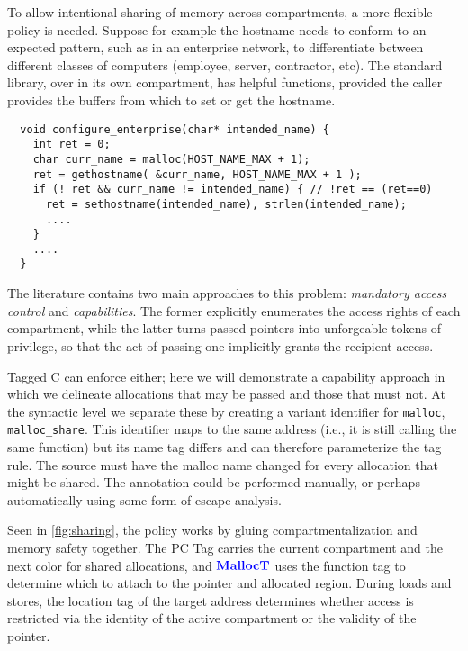 \documentclass{llncs}
\begin{document}
To allow intentional sharing of memory across compartments, a more flexible policy is needed. 
Suppose for example the hostname needs to conform to an expected pattern, 
such as in an enterprise network, to differentiate between different classes of
computers (employee, server, contractor, etc). The standard library, 
over in its own compartment, has helpful functions, 
provided the caller provides the buffers from which to set or get the hostname. 

\begin{verbatim}
  void configure_enterprise(char* intended_name) {
    int ret = 0;
    char curr_name = malloc(HOST_NAME_MAX + 1);
    ret = gethostname( &curr_name, HOST_NAME_MAX + 1 );
    if (! ret && curr_name != intended_name) { // !ret == (ret==0)
      ret = sethostname(intended_name), strlen(intended_name);
      ....
    }
    ....
  }
\end{verbatim}

The literature contains two main approaches to this problem:
{\em mandatory access control} and {\em capabilities}. The former explicitly
enumerates the access rights of each compartment, while the latter turns passed
pointers into unforgeable tokens of privilege, so that the act of passing one
implicitly grants the recipient access.

Tagged C can enforce either; here we will demonstrate a capability approach
in which we delineate allocations that may be passed and those that must not.
At the syntactic level we separate these by creating a variant identifier for {\tt malloc},
{\tt malloc\_share}. This identifier maps to the same address (i.e., it is still calling the same function)
but its name tag differs and can therefore parameterize the tag rule. The source
must have the malloc name changed for every allocation that might be shared.
The annotation could be performed manually, or perhaps automatically using some form
of escape analysis.

Seen in \cref{fig:sharing}, the policy works by gluing compartmentalization and memory safety
together. The PC Tag carries the current compartment and the next color for shared allocations,
and \(\color{blue} \mathbf{MallocT}\) uses the function tag to determine which to attach to the pointer and allocated
region. During loads and stores, the location tag of the target address
determines whether access is restricted via the identity of the active compartment or
the validity of the pointer.

\end{document}
